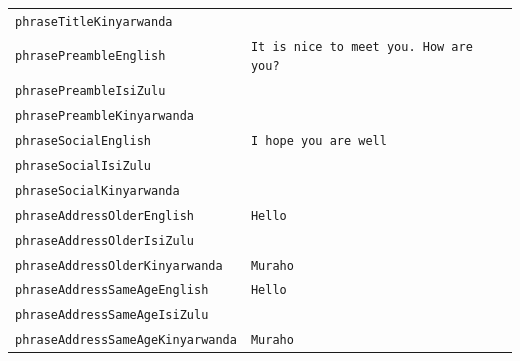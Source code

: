 \documentclass{CSSRforAfrica}
\begin{document}
\begin{table}[H]
\begin{center}
\begin{tabular}{|l l l|}
{\footnotesize \verb+phraseTitleKinyarwanda+}     & {\footnotesize \verb++}\vspace{-1mm} & {\footnotesize  } \\
{\footnotesize \verb+phrasePreambleEnglish+}     & {\footnotesize \verb+It is nice to meet you. How are you?+}\vspace{-1mm} & {\footnotesize  } \\
{\footnotesize \verb+phrasePreambleIsiZulu+}     & {\footnotesize \verb++}\vspace{-1mm} & {\footnotesize  } \\
{\footnotesize \verb+phrasePreambleKinyarwanda+}     & {\footnotesize \verb++}\vspace{-1mm} & {\footnotesize  } \\
{\footnotesize \verb+phraseSocialEnglish+}     & {\footnotesize \verb+I hope you are well+}\vspace{-1mm} & {\footnotesize  } \\
{\footnotesize \verb+phraseSocialIsiZulu+}     & {\footnotesize \verb++}\vspace{-1mm} & {\footnotesize  } \\
{\footnotesize \verb+phraseSocialKinyarwanda+}     & {\footnotesize \verb++}\vspace{-1mm} & {\footnotesize  } \\
{\footnotesize \verb+phraseAddressOlderEnglish+}     & {\footnotesize \verb+Hello+ } \vspace{-1mm} & {\footnotesize  } \\
{\footnotesize \verb+phraseAddressOlderIsiZulu+}     & {\footnotesize \verb++ } \vspace{-1mm} & {\footnotesize  } \\
{\footnotesize \verb+phraseAddressOlderKinyarwanda+}     & {\footnotesize \verb+Muraho+ } \vspace{-1mm} & {\footnotesize  } \\
{\footnotesize \verb+phraseAddressSameAgeEnglish+}     & {\footnotesize \verb+Hello+} \vspace{-1mm} & {\footnotesize  } \\
{\footnotesize \verb+phraseAddressSameAgeIsiZulu+}     & {\footnotesize \verb++} \vspace{-1mm} & {\footnotesize  } \\
{\footnotesize \verb+phraseAddressSameAgeKinyarwanda+}     & {\footnotesize \verb+Muraho+} \vspace{-1mm} & {\footnotesize  } \\

\end{tabular}
\end{center}
\end{table}
\end{document}
